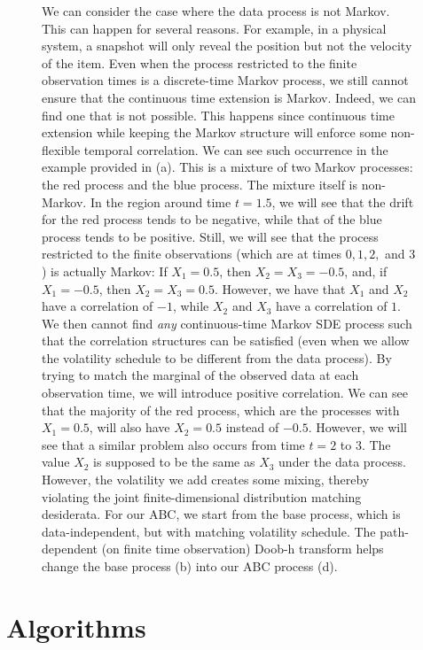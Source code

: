 \documentclass{article}
\begin{document}
\begin{figure}[p]
    \caption{We can consider the case where the data process is not Markov. This can happen for several reasons. For example, in a physical system, a snapshot will only reveal the position but not the velocity of the item. Even when the process restricted to the finite observation times is a discrete-time Markov process, we still cannot ensure that the continuous time extension is Markov. Indeed, we can find one that is not possible. This happens since continuous time extension while keeping the Markov structure will enforce some non-flexible temporal correlation. We can see such occurrence in the example provided in (a). This is a mixture of two Markov processes: the red process and the blue process. The mixture itself is non-Markov. In the region around time $t=1.5$, we will see that the drift for the red process tends to be negative, while that of the blue process tends to be positive. Still, we will see that the process restricted to the finite observations (which are at times $0,1,2,$ and $3$) is actually Markov: If $X_1 = 0.5$, then $X_2=X_3=-0.5$, and, if $X_1 = -0.5$, then $X_2=X_3=0.5$. However, we have that $X_1$ and $X_2$ have a correlation of $-1$, while $X_2$ and $X_3$ have a correlation of $1$. We then cannot find \textit{any} continuous-time Markov SDE process such that the correlation structures can be satisfied (even when we allow the volatility schedule to be different from the data process). By trying to match the marginal of the observed data at each observation time, we will introduce positive correlation. We can see that the majority of the red process, which are the processes with $X_1=0.5$, will also have $X_2=0.5$ instead of $-0.5$.
    However, we will see that a similar problem also occurs from time $t=2$ to $3$. The value $X_2$ is supposed to be the same as $X_3$ under the data process. However, the volatility we add creates some mixing, thereby violating the joint finite-dimensional distribution matching desiderata. For our ABC, we start from the base process, which is data-independent, but with matching volatility schedule. The path-dependent (on finite time observation) Doob-h transform helps change the base process (b) into our ABC process (d).}
    \label{fig:nonmarkov}

\end{figure}

\newpage
\clearpage

\section{Algorithms}
\end{document}
